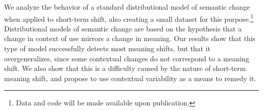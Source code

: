 We analyze the behavior of a standard distributional model of
semantic change when applied to short-term shift,
also creating a small dataset for this purpose.\footnote{Data and code
will be made available upon publication.} 
Distributional models of semantic change are based on the hypothesis that a change in context of use mirrors a change in meaning.
Our results show that this type of model successfully detects most meaning shifts, but that it overgeneralizes, since some contextual changes do not correspond to a meaning shift.
We also show that this is a difficulty caused by the nature of short-term meaning shift, and propose to use contextual variability as a means to remedy it.





